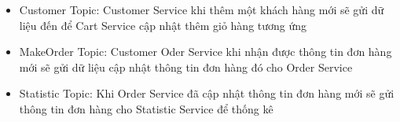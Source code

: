 \begin{itemize}
	\item Customer Topic: Customer Service khi thêm một khách hàng mới sẽ gửi dữ liệu đến để Cart Service cập nhật thêm giỏ hàng tương ứng
	\item MakeOrder Topic: Customer Oder Service khi nhận được thông tin đơn hàng mới sẽ gửi dữ liệu cập nhật thông tin đơn hàng đó cho Order Service
	\item Statistic Topic: Khi Order Service đã cập nhật thông tin đơn hàng mới sẽ gửi thông tin đơn hàng cho Statistic Service để thống kê
\end{itemize}